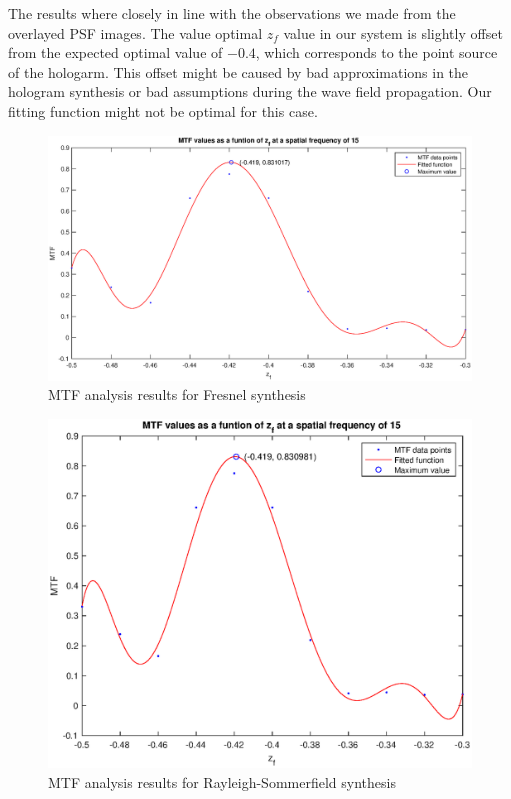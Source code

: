 \documentclass[12pt,a4paper,english
]{tunithesis}
\begin{document}
The results where closely in line with the observations we made from the overlayed PSF images. The value optimal $z_f$ value in our system is slightly offset from the expected optimal value of $-0.4$, which corresponds to the point source of the hologarm. This offset might be caused by bad approximations in the hologram synthesis or bad assumptions during the wave field propagation. Our fitting function might not be optimal for this case.

\begin{figure}
  \centering
  \includegraphics[width=\columnwidth]{img/mtf_fresnel.eps}
  \caption{MTF analysis results for Fresnel synthesis}
  \label{fig:mtf_fresnel}
\end{figure}

\begin{figure}
  \centering
  \includegraphics[width=\columnwidth]{img/mtf_rs.eps}
  \caption{MTF analysis results for Rayleigh-Sommerfield synthesis}
  \label{fig:mtf_rs}
\end{figure}
\end{document}
